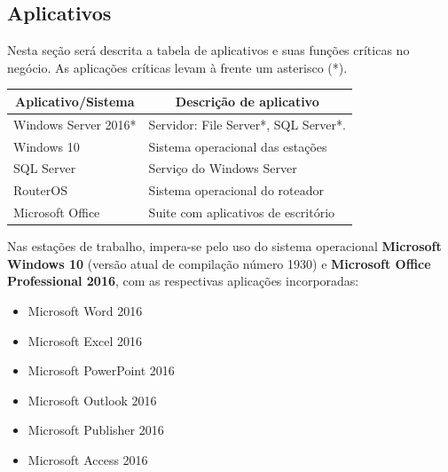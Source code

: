 \documentclass[	DIV=calc,%
							paper=a4,%
							fontsize=12pt,%
							onecolumn]{scrartcl}	 					%
\begin{document}
\subsection{Aplicativos}

Nesta seção será descrita a tabela de aplicativos e suas funções críticas no negócio. As aplicações críticas levam à frente um asterisco (*).




\begin{table}[H]
	\centering
	\renewcommand{\arraystretch}{2.0}
	\begin{tabular}{|l|l|}
		\hline
		\multicolumn{1}{|c|}{\textbf{Aplicativo/Sistema}} &	 \multicolumn{1}{|c|}{\textbf{Descrição  de aplicativo}}                                 		  \\ \hline
		Windows Server 2016*                               
		& Servidor: File Server*, SQL Server*.                                               \\ \hline
		Windows 10                             
		& Sistema operacional das estações           					\\ \hline
		SQL Server                                  
		& Serviço do Windows Server          \\ \hline
		RouterOS
		& Sistema operacional do roteador         \\ \hline
		Microsoft Office                                  
		& Suite com aplicativos de escritório   \\ \hline
	\end{tabular}
\end{table}


Nas estações de trabalho, impera-se pelo uso do sistema operacional \textbf{Microsoft Windows 10} (versão atual de compilação número 1930) e \textbf{Microsoft Office Professional 2016}, com as respectivas aplicações incorporadas: \\ 

\begin{itemize}
	\item Microsoft Word 2016 
	\item Microsoft Excel 2016
	\item Microsoft PowerPoint 2016
	\item Microsoft Outlook 2016
	\item Microsoft Publisher 2016
	\item Microsoft Access 2016
\end{itemize}
\end{document}
